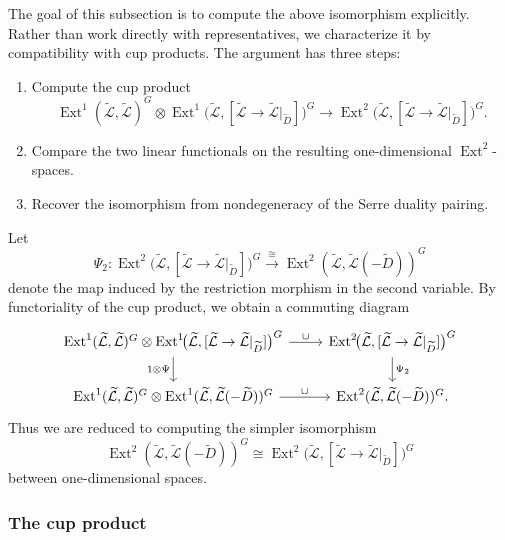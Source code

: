 \documentclass[dvipsnames,11pt]{article}
\theoremstyle{definition}
\def\Ext{\operatorname{Ext}}
\def\Ext{\operatorname{Ext}}
\begin{document}
The goal of this subsection is to compute the above isomorphism explicitly. Rather than work directly with representatives, we characterize it by compatibility with cup products. The argument has three steps:
\begin{enumerate}
\item Compute the cup product
\[
\Ext^1(\widetilde{\mathcal L},\widetilde{\mathcal L})^G
\otimes
\Ext^1\!\bigl(\widetilde{\mathcal L},[\widetilde{\mathcal L}\to \widetilde{\mathcal L}|_{\widetilde D}]\bigr)^G
\to
\Ext^2\!\bigl(\widetilde{\mathcal L},[\widetilde{\mathcal L}\to \widetilde{\mathcal L}|_{\widetilde D}]\bigr)^G.
\]
\item Compare the two linear functionals on the resulting one-dimensional \(\Ext^2\)-spaces.
\item Recover the isomorphism from nondegeneracy of the Serre duality pairing.
\end{enumerate}

Let
\[
\Psi_2:
\Ext^2\!\bigl(\widetilde{\mathcal L},[\widetilde{\mathcal L}\to \widetilde{\mathcal L}|_{\widetilde D}]\bigr)^G
\xrightarrow{\ \cong\ }
\Ext^2(\widetilde{\mathcal L},\widetilde{\mathcal L}(-\widetilde D))^G
\]
denote the map induced by the restriction morphism in the second variable. By functoriality of the cup product, we obtain a commuting diagram
\[
\begin{tikzcd}
\Ext^1(\widetilde{\mathcal L},\widetilde{\mathcal L})^G
\otimes
\Ext^1\!\bigl(\widetilde{\mathcal L},[\widetilde{\mathcal L}\to \widetilde{\mathcal L}|_{\widetilde D}]\bigr)^G  \arrow[r,"\cup"] \arrow[d,"1\otimes \Psi"']
&  \Ext^2\!\bigl(\widetilde{\mathcal L},[\widetilde{\mathcal L}\to \widetilde{\mathcal L}|_{\widetilde D}]\bigr)^G\arrow[d,"\Psi_2"] \\
\Ext^1(\widetilde{\mathcal L},\widetilde{\mathcal L})^G \otimes
\Ext^1(\widetilde{\mathcal L},\widetilde{\mathcal L}(-\widetilde D))^G  \arrow[r,"\cup"] 
&  \Ext^2(\widetilde{\mathcal L},\widetilde{\mathcal L}(-\widetilde D))^G.
\end{tikzcd}
\]
Thus we are reduced to computing the simpler isomorphism 
\[
\Ext^2(\widetilde{\mathcal L},\widetilde{\mathcal L}(-\widetilde D))^G \cong  \Ext^2\!\bigl(\widetilde{\mathcal L},[\widetilde{\mathcal L}\to \widetilde{\mathcal L}|_{\widetilde D}]\bigr)^G
\]
between one-dimensional spaces.


\subsubsection{The cup product}\label{subsection cup product}
\end{document}

